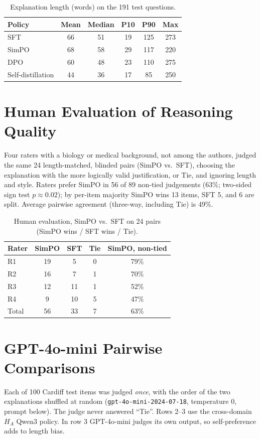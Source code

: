 \begin{table}[H]
\centering
\small
\caption{Explanation length (words) on the 191 test questions.}
\label{tab:reasoning_lengths}
\begin{tabular}{lccccc}
\toprule
Policy & Mean & Median & P10 & P90 & Max \\
\midrule
SFT & 66 & 51 & 19 & 125 & 273 \\
SimPO & 68 & 58 & 29 & 117 & 220 \\
DPO & 60 & 48 & 23 & 110 & 275 \\
Self-distillation & 44 & 36 & 17 & 85 & 250 \\
\bottomrule
\end{tabular}
\end{table}

\section{Human Evaluation of Reasoning Quality}
\label{sec:human_appendix}
Four raters with a biology or medical background, not among the authors, judged the same 24 length-matched, blinded pairs (SimPO vs.\ SFT), choosing the explanation with the more logically valid justification, or Tie, and ignoring length and style. Raters prefer SimPO in 56 of 89 non-tied judgements (63\%; two-sided sign test $p\approx0.02$); by per-item majority SimPO wins 13 items, SFT 5, and 6 are split. Average pairwise agreement (three-way, including Tie) is 49\%.

\begin{table}[H]
\centering
\small
\caption{Human evaluation, SimPO vs.\ SFT on 24 pairs (SimPO wins / SFT wins / Tie).}
\label{tab:human_eval}
\begin{tabular}{lcccc}
\toprule
Rater & SimPO & SFT & Tie & SimPO, non-tied \\
\midrule
R1 & 19 & 5 & 0 & 79\% \\
R2 & 16 & 7 & 1 & 70\% \\
R3 & 12 & 11 & 1 & 52\% \\
R4 & 9 & 10 & 5 & 47\% \\
\midrule
Total & 56 & 33 & 7 & 63\% \\
\bottomrule
\end{tabular}
\end{table}

\section{GPT-4o-mini Pairwise Comparisons}
\label{sec:pairwise_appendix}
\label{sec:judge_prompt}
Each of 100 Cardiff test items was judged \emph{once}, with the order of the two explanations shuffled at random (\texttt{gpt-4o-mini-2024-07-18}, temperature 0, prompt below). The judge never answered ``Tie''. Rows 2--3 use the cross-domain $H_A$ Qwen3 policy. In row 3 GPT-4o-mini judges its own output, so self-preference \citep{pan2024evalbias} adds to length bias.

